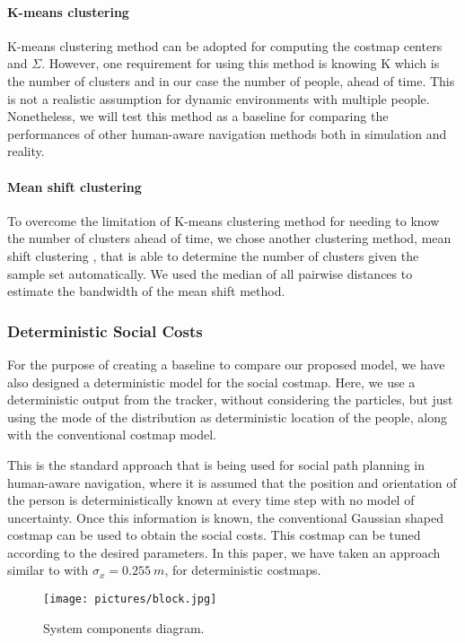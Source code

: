 \paragraph{K-means clustering}

K-means clustering \cite{hartigan1979algorithm} method can be adopted for computing the costmap centers and $\Sigma$. However, one requirement for using this method is knowing K which is the number of clusters and in our case the number of people, ahead of time. This is not a realistic assumption for dynamic environments with multiple people. Nonetheless, we will test this method as a baseline for comparing the performances of other human-aware navigation methods both in simulation and reality.

\paragraph{Mean shift clustering}
To overcome the limitation of K-means clustering method for needing to know the number of clusters ahead of time, we chose another clustering method, mean shift clustering \cite{comaniciu2002mean}, that is able to determine the number of clusters given the sample set automatically. We used the median of all pairwise distances to estimate the bandwidth of the mean shift method.


\subsubsection{Deterministic Social Costs}
For the purpose of creating a baseline to compare our proposed model, we have also designed a deterministic model for the social costmap. 
Here, we use a deterministic output from the tracker, without considering the particles, but just using the mode of the distribution as deterministic location of the people, along with the conventional costmap model. 


This is the standard approach that is being used for social path planning in human-aware navigation, where it is assumed that the position and orientation of the person is deterministically known at every time step with no model of uncertainty. Once this information is known, the conventional Gaussian shaped costmap can be used to obtain the social costs. This costmap can be tuned according to the desired parameters. In this paper, we have taken an approach similar to \cite{gomez2013social} with ${\sigma}_{x} = 0.255\ m$, for deterministic costmaps. 



\begin{figure}
\centering
{\texttt{[image: pictures/block.jpg]}}

\caption{System components diagram.}
\label{fig:block}
\end{figure}
